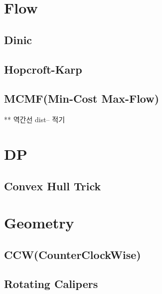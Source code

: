 \documentclass[10pt, a4paper]{article}
\begin{document}
\section{Flow}

\subsection{Dinic}


\subsection{Hopcroft-Karp}


\subsection{MCMF(Min-Cost Max-Flow)}
** 역간선 dist-- 적기




\section{DP}

\subsection{Convex Hull Trick}


% 



\section{Geometry}

\subsection{CCW(CounterClockWise)}


\subsection{Rotating Calipers}

\end{document}
